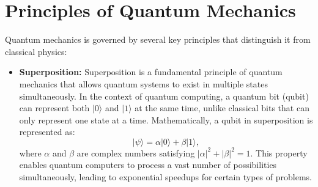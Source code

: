\documentclass[12pt,a4paper]{report}
\begin{document}
\section{Principles of Quantum Mechanics}
Quantum mechanics is governed by several key principles that distinguish it from classical physics:

\begin{itemize}
    \item \textbf{Superposition:} 
    Superposition is a fundamental principle of quantum mechanics that allows quantum systems to exist in multiple states simultaneously. In the context of quantum computing, a quantum bit (qubit) can represent both \( |0\rangle \) and \( |1\rangle \) at the same time, unlike classical bits that can only represent one state at a time. Mathematically, a qubit in superposition is represented as:
    \[
    |\psi\rangle = \alpha |0\rangle + \beta |1\rangle,
    \]
    where \( \alpha \) and \( \beta \) are complex numbers satisfying \( |\alpha|^2 + |\beta|^2 = 1 \). This property enables quantum computers to process a vast number of possibilities simultaneously, leading to exponential speedups for certain types of problems.
    \begin{figure}[H]
        \centering
\end{figure}
\end{itemize}
\end{document}
